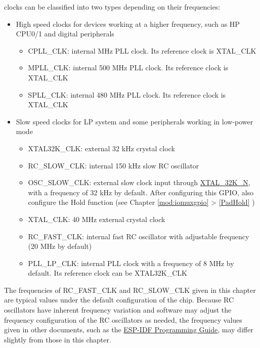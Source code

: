 \documentclass[main\_\_EN.tex]{subfiles}
\begin{document}
\chipname{} clocks can be classified into two types depending on their frequencies:
\begin{itemize}
    \item High speed clocks for devices working at a higher frequency, such as HP CPU0/1 and digital peripherals
    \begin{itemize}
        \item CPLL\_CLK: internal  MHz PLL clock. Its reference clock is XTAL\_CLK
        \item MPLL\_CLK: internal 500 MHz PLL clock. Its reference clock is XTAL\_CLK
        \item SPLL\_CLK: internal 480 MHz PLL clock. Its reference clock is XTAL\_CLK
    \end{itemize}
    \item Slow speed clocks for LP system and some peripherals working in low-power mode
    \begin{itemize}
        \item XTAL32K\_CLK: external 32 kHz crystal clock
        \item RC\_SLOW\_CLK: internal 150 kHz slow RC oscillator
        \item OSC\_SLOW\_CLK: external slow clock input through \hyperref[tab:ANA-IO-MUX-EN]{XTAL\_32K\_N}, with a frequency of 32 kHz by default. After configuring this GPIO, also configure the Hold function (see Chapter \ref{mod:iomuxgpio} \textit{} > \ref{PadHold} \textit{})
        \item XTAL\_CLK: 40 MHz external crystal clock
        \item RC\_FAST\_CLK: internal fast RC oscillator with adjustable frequency (20 MHz by default)
        \item PLL\_LP\_CLK: internal PLL clock with a frequency of 8 MHz by default. Its reference clock can be XTAL32K\_CLK
    \end{itemize}
\end{itemize}

\begin{tiplisting}
The frequencies of RC\_FAST\_CLK and RC\_SLOW\_CLK given in this chapter are typical values under the default configuration of the chip. Because RC oscillators have inherent frequency variation and software may adjust the frequency configuration of the RC oscillators as needed, the frequency values given in other documents, such as the \href{https://docs.espressif.com/projects/esp-idf/en/latest/esp32p4/api-reference/peripherals/clk_tree.html}{ESP-IDF Programming Guide}, may differ slightly from those in this chapter.
\end{tiplisting}
\end{document}
